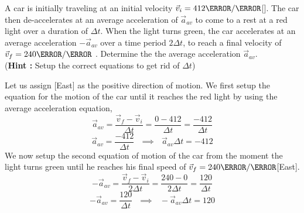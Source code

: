 \documentclass[12pt]{article} %
\newcommand{\tx}[1]{\text{#1}}
\begin{document}
\begin{qstn}[8]
    A car is initially traveling at an initial velocity $\vec v_i = 412 \m / \s$[\tx{East}]. The car then de-accelerates at an average acceleration of $\vec a_{av}$ to come to a rest at a red light over a duration of $\Delta t$. When the light turns green, the car accelerates at an average acceleration $-\vec a_{av}$ over a time period $2\Delta t$, to reach a final velocity of $\vec v_f = 240 \m / \s$ \tx{[East]} . Determine the the average acceleration $\vec a_{av}$. \\(\textbf{Hint :} Setup the correct equations to get rid of $\Delta t$) 

    \begin{soln}
        Let us assign [East] as the positive direction of motion. We first setup the equation for the motion of the car until it reaches the red light by using the average acceleration equation,
        $$\vec a_{av} = \frac{\vec v_f - \vec v_i}{\Delta t} = \frac{0 - 412}{\Delta t} = \frac{-412}{\Delta t}$$
        \begin{equation}
            \vec a_{av} = \frac{-412}{\Delta t} \:\:\: \implies \:\:\: \vec a_{av}\Delta t = -412
        \end{equation}
        We now setup the second equation of motion of the car from the moment the light turns green until he reaches his final speed of $\vec v_f = 240\m / \s$[East].
        $$-\vec a_{av} = \frac{\vec v_f - \vec v_i}{2\Delta t} = \frac{240 - 0}{2\Delta t} = \frac{120}{\Delta t}$$
        \begin{equation}
            -\vec a_{av} = \frac{120}{\Delta t}\:\:\: \implies \:\:\: -\vec a_{av}\Delta t = 120
        \end{equation}


    \end{soln}
 \end{qstn}
\end{document}
